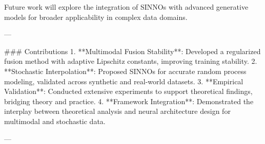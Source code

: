 Future work will explore the integration of SINNOs with advanced generative models for broader applicability in complex data domains.

---

### Contributions  
1. **Multimodal Fusion Stability**: Developed a regularized fusion method with adaptive Lipschitz constants, improving training stability.  
2. **Stochastic Interpolation**: Proposed SINNOs for accurate random process modeling, validated across synthetic and real-world datasets.  
3. **Empirical Validation**: Conducted extensive experiments to support theoretical findings, bridging theory and practice.  
4. **Framework Integration**: Demonstrated the interplay between theoretical analysis and neural architecture design for multimodal and stochastic data.  

---